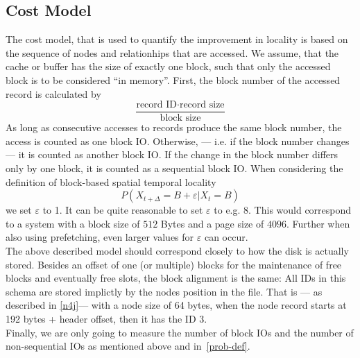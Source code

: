     \subsection*{Cost Model}
        The cost model, that is used to quantify the improvement in locality is based on the sequence of nodes and relationhips that are accessed. 
        We assume, that the cache or buffer has the size of exactly one block, such that only the accessed block is to be considered ``in memory''.
        First, the block number of the accessed record is calculated by 
        \[ \frac{\text{record ID} \cdot \text{record size}}{\text{block size}} \]
        As long as consecutive accesses to records produce the same block number, the access is counted as one block IO.
        Otherwise, --- i.e. if the block number changes --- it is counted as another block IO. 
        If the change in the block number differs only by one block, it is counted as a sequential block IO.
        When considering the definition of block-based spatial temporal locality
        \[ P(X_{t + \Delta} = B + \varepsilon | X_t = B) \]
        we set $\varepsilon$ to 1. 
        It can be quite reasonable to set $\varepsilon$ to e.g. $8$.
        This would correspond to a system with a block size of $512$ Bytes and a page size of $4096$.
        Further when also using prefetching, even larger values for $\varepsilon$ can occur.  \\
        The above described model should correspond closely to how the disk is actually stored. 
        Besides an offset of one (or multiple) blocks for the maintenance of free blocks and eventually free slots, the block alignment is the same:
        All IDs in this schema are stored implictly by the nodes position in the file. 
        That is --- as described in \ref{n4j}--- with a node size of 64 bytes, when the node record starts at 192 bytes + header offset, then it has the ID $3$. \\
        Finally, we are only going to measure the number of block IOs and the number of non-sequential IOs as mentioned above and in~\ref{prob-def}.
    
